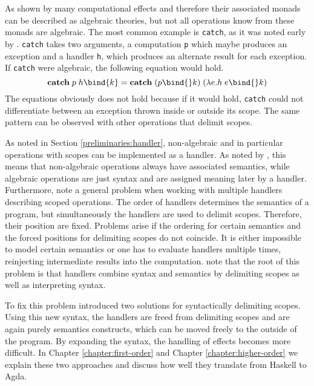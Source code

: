 As shown by \textcite{DBLP:conf/fossacs/PlotkinP02} many computational effects
and therefore their associated monads can be described as algebraic theories,
but not all operations know from these monads are algebraic.
The most common example is \texttt{catch}, as it was noted early by
\textcite{DBLP:journals/acs/PlotkinP03}.
\texttt{catch} takes two arguments, a computation \texttt{p} which maybe
produces an exception and a handler \texttt{h}, which produces an alternate
result for each exception.
If \texttt{catch} were algebraic, the following equation would hold.
\[
  \textbf{catch}\; p\; h \bind{k} = \textbf{catch}\;(p\bind{} k)\;(\lambda
  e.h\; e \bind{} k)
\]
The equations obviously does not hold because if it would hold, \texttt{catch}
could not differentiate between an exception thrown inside or outside its scope.
The same pattern can be observed with other operations that delimit scopes.

As noted in Section \ref{preliminaries:handler}, non-algebraic and in particular
operations with scopes can be implemented as a handler.
As noted by \textcite{DBLP:conf/lics/PirogSWJ18}, this means that non-algebraic
operations always have associated semantics, while algebraic operations are just
syntax and are assigned meaning later by a handler.
Furthermore, \textcite{DBLP:conf/haskell/WuSH14} note a general problem when
working with multiple handlers describing scoped operations.
The order of handlers determines the semantics of a program, but simultaneously
the handlers are used to delimit scopes.
Therefore, their position are fixed.
Problems arise if the ordering for certain semantics and the forced positions
for delimiting scopes do not coincide.
It is either impossible to model certain semantics or one has to evaluate
handlers multiple times, reinjecting intermediate results into the
computation.
\textcite{DBLP:conf/haskell/WuSH14} note that the root of this problem is that
handlers combine syntax and semantics by delimiting scopes as well as
interpreting syntax.


To fix this problem \textcite{DBLP:conf/haskell/WuSH14} introduced two solutions
for syntactically delimiting scopes.
Using this new syntax, the handlers are freed from delimiting scopes and are
again purely semantics constructs, which can be moved freely to the outside of the
program.
By expanding the syntax, the handling of effects becomes more difficult.
In Chapter \ref{chapter:first-order} and Chapter \ref{chapter:higher-order} we
explain these two approaches and discuss how well they translate from Haskell to
Agda.
